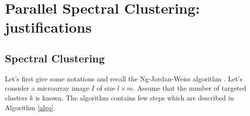\documentclass[]{svmult}
\begin{document}
\vspace{-0.5cm}
\section{Parallel Spectral Clustering: justifications}

\vspace{-0.3cm}
\subsection{Spectral Clustering}
\vspace{-0.3cm}
Let's first give some notations and recall the Ng-Jordan-Weiss  algorithm
\cite{speC}. Let's consider a microarray image $I$ of size $l \times m$.
Assume that the number of targeted clusters $k$ is known. The algorithm
contains few steps which are described in Algorithm \ref{algo}.
\end{document}
